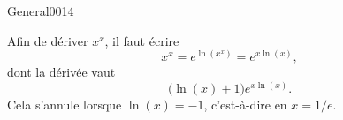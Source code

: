 \begin{corrige}{General0014}

Afin de dériver $x^x$, il faut écrire
\begin{equation}
	x^x= e^{\ln(x^x)}= e^{x\ln(x)},
\end{equation}
dont la dérivée vaut
\begin{equation}
	\big( \ln(x)+1 \big) e^{x\ln(x)}.
\end{equation}
Cela s'annule lorsque $\ln(x)=-1$, c'est-à-dire en $x=1/e$.

\end{corrige}
